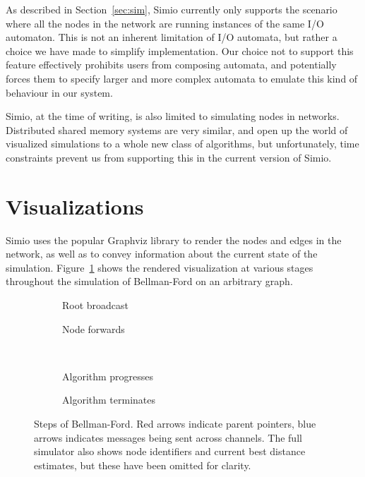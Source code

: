 \documentclass{scrartcl}
\begin{document}
As described in Section~\ref{sec:sim}, Simio currently only supports the
scenario where all the nodes in the network are running instances of the same
I/O automaton. This is not an inherent limitation of I/O automata, but rather a
choice we have made to simplify implementation. Our choice not to support this
feature effectively prohibits users from composing automata, and potentially
forces them to specify larger and more complex automata to emulate this kind of
behaviour in our system.

Simio, at the time of writing, is also limited to simulating nodes in networks.
Distributed shared memory systems are very similar, and open up the world of
visualized simulations to a whole new class of algorithms, but unfortunately,
time constraints prevent us from supporting this in the current version of
Simio.

\section{Visualizations}

Simio uses the popular Graphviz library\cite{gv} to render the nodes and edges
in the network, as well as to convey information about the current state of the
simulation. Figure~\ref{fig:viz} shows the rendered visualization at various
stages throughout the simulation of Bellman-Ford on an arbitrary graph.

\begin{figure}[h]
	\centering
	\begin{subfigure}[b]{0.49\textwidth}
		
		\caption{Root broadcast}
	\end{subfigure}
	\begin{subfigure}[b]{0.49\textwidth}
		
		\caption{Node forwards}
	\end{subfigure}
	\\
	\begin{subfigure}[b]{0.49\textwidth}
		
		\caption{Algorithm progresses}
	\end{subfigure}
	\begin{subfigure}[b]{0.49\textwidth}
		
		\caption{Algorithm terminates}
	\end{subfigure}
	\caption{Steps of Bellman-Ford. Red arrows indicate parent pointers,
		blue arrows indicates messages being sent across channels. The
		full simulator also shows node identifiers and current best
		distance estimates, but these have been omitted for clarity.}\label{fig:viz}
\end{figure}
\end{document}
